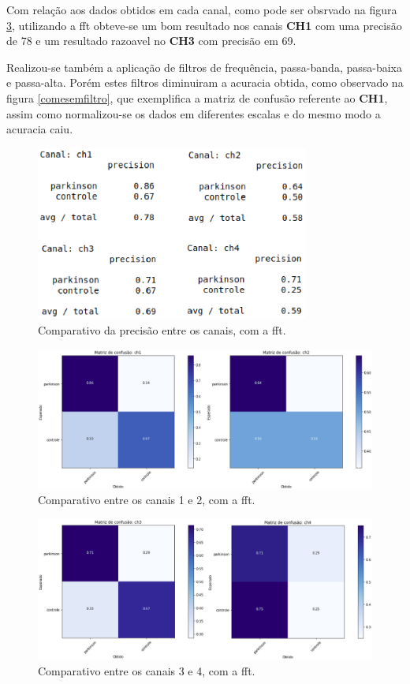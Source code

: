 Com relação aos dados obtidos em cada canal, como pode ser obsrvado na figura \ref{fcomparativo}, utilizando a fft obteve-se um bom resultado nos canais \textbf{CH1} com uma precisão de 78 e um resultado razoavel no \textbf{CH3} com precisão em 69.

Realizou-se também a aplicação de filtros de frequência, passa-banda, passa-baixa e passa-alta. Porém estes filtros diminuiram a acuracia obtida, como observado na figura \ref{comesemfiltro}, que exemplifica a matriz de confusão referente ao \textbf{CH1}, assim como normalizou-se os dados em diferentes escalas e do mesmo modo a acuracia caiu.

\begin{figure}[!htb]
	\centering
	\includegraphics[width=0.8\textwidth]{figuras/fcomparativo.eps}
	\caption{Comparativo da precisão entre os canais, com a fft.}
	\label{fcomparativo}
\end{figure}

\begin{figure}[!htb]
	\centering
	\includegraphics[width=1.1\textwidth]{figuras/CH12Comp.eps}
	\caption{Comparativo entre os canais 1 e 2, com a fft.}
	\label{fcomparativo}
\end{figure}

\begin{figure}[!htb]
	\centering
	\includegraphics[width=1.1\textwidth]{figuras/CH34Comp.eps}
	\caption{Comparativo entre os canais 3 e 4, com a fft.}
	\label{fcomparativo}
\end{figure}


